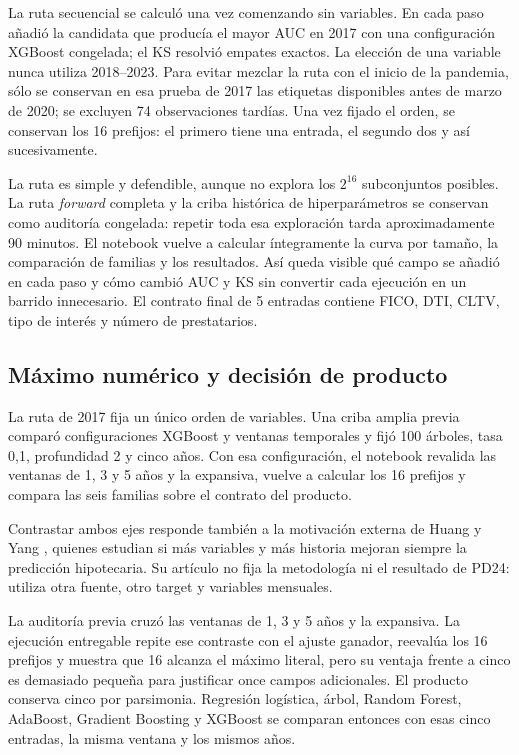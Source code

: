 \documentclass[10pt,a4paper]{article}
\newcommand{\SelectedK}{5}
\newcommand{\SelectedFeatures}{FICO, DTI, CLTV, tipo de interés y número de prestatarios}
\begin{document}
La ruta secuencial se calculó una vez comenzando sin variables. En cada paso
añadió la candidata que producía el mayor AUC en 2017 con una configuración
XGBoost congelada; el KS resolvió empates exactos. La elección de una variable
nunca utiliza 2018--2023.
Para evitar mezclar la ruta con el inicio de la pandemia, sólo se conservan en
esa prueba de 2017 las etiquetas disponibles antes de marzo de 2020; se excluyen
74 observaciones tardías.
Una vez fijado el orden, se conservan los 16 prefijos: el primero tiene una entrada, el
segundo dos y así sucesivamente.

La ruta es simple y defendible, aunque no explora los $2^{16}$ subconjuntos
posibles. La ruta \emph{forward} completa y la criba histórica de
hiperparámetros se conservan como auditoría congelada: repetir toda esa
exploración tarda aproximadamente 90 minutos. El notebook vuelve a calcular
íntegramente la curva por tamaño, la comparación de familias y los resultados.
Así queda visible qué campo se añadió en cada paso y cómo cambió AUC y KS sin
convertir cada ejecución en un barrido innecesario. El contrato final de
\SelectedK{} entradas contiene \SelectedFeatures{}.

\subsection{Máximo numérico y decisión de producto}

La ruta de 2017 fija un único orden de variables. Una criba amplia previa comparó
configuraciones XGBoost y ventanas temporales y fijó 100 árboles, tasa 0,1,
profundidad 2 y cinco años. Con esa configuración, el notebook revalida las
ventanas de 1, 3 y 5 años y la expansiva, vuelve a calcular los 16 prefijos y
compara las seis familias sobre el contrato del producto.

Contrastar ambos ejes responde también a la motivación externa de Huang y Yang
\cite{huang-yang-2024}, quienes estudian si más variables y más historia mejoran
siempre la predicción hipotecaria. Su artículo no fija la metodología ni el
resultado de PD24: utiliza otra fuente, otro target y variables mensuales.

La auditoría previa cruzó las ventanas de 1, 3 y 5 años y la expansiva. La
ejecución entregable repite ese contraste con el ajuste ganador, reevalúa los 16
prefijos y muestra que 16 alcanza el máximo literal, pero su ventaja frente a cinco es
demasiado pequeña para justificar once campos adicionales. El producto conserva
cinco por parsimonia. Regresión logística, árbol, Random Forest, AdaBoost,
Gradient Boosting y XGBoost se comparan entonces con esas cinco entradas, la
misma ventana y los mismos años.
\end{document}
